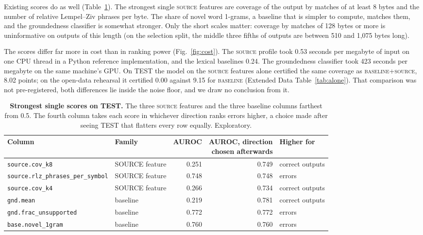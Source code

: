 \documentclass[11pt]{article}
\newcommand{\arm}[1]{\textsc{#1}}
\begin{document}
Existing scores do as well (Table~\ref{tab:single}). The strongest single \arm{source} features are coverage of the output by matches of at least 8 bytes and the number of relative Lempel--Ziv phrases per byte. The share of novel word 1-grams, a baseline that is simpler to compute, matches them, and the groundedness classifier is somewhat stronger. Only the short scales matter: coverage by matches of 128 bytes or more is uninformative on outputs of this length (on the selection split, the middle three fifths of outputs are between 510 and 1,075 bytes long).

The scores differ far more in cost than in ranking power (Fig.~\ref{fig:cost}). The \arm{source} profile took 0.53 seconds per megabyte of input on one CPU thread in a Python reference implementation, and the lexical baselines 0.24. The groundedness classifier took 423 seconds per megabyte on the same machine's GPU. On TEST the model on the \arm{source} features alone certified the same coverage as \arm{baseline+source}, 8.02 points; on the open-data rehearsal it certified 0.00 against 9.15 for \arm{baseline} (Extended Data Table~\ref{tab:alone}). That comparison was not pre-registered, both differences lie inside the noise floor, and we draw no conclusion from it.

\begin{table}[t]
\centering
\small
\caption{\textbf{Strongest single scores on TEST.} The three \arm{source} features and the three baseline columns farthest from 0.5. The fourth column takes each score in whichever direction ranks errors higher, a choice made after seeing TEST that flatters every row equally. Exploratory.}
\label{tab:single}
\begin{tabular}{@{}llrrl@{}}
\toprule
Column & Family & AUROC & \shortstack[r]{AUROC, direction\\chosen afterwards} & Higher for \\
\midrule
\texttt{source.cov\_k8} & SOURCE feature & 0.251 & 0.749 & correct outputs \\
\texttt{source.rlz\_phrases\_per\_symbol} & SOURCE feature & 0.748 & 0.748 & errors \\
\texttt{source.cov\_k4} & SOURCE feature & 0.266 & 0.734 & correct outputs \\
\texttt{gnd.mean} & baseline & 0.219 & 0.781 & correct outputs \\
\texttt{gnd.frac\_unsupported} & baseline & 0.772 & 0.772 & errors \\
\texttt{base.novel\_1gram} & baseline & 0.760 & 0.760 & errors \\
\bottomrule
\end{tabular}
\end{table}
\end{document}
